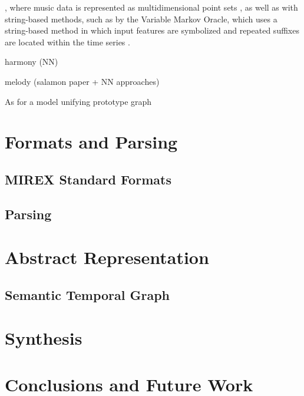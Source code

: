 \documentclass{article}
\begin{document}
, where music data is represented as multidimensional point sets \cite{Hsiao_2023_motifs}, as well as with string-based methods, such as 
by the Variable Markov Oracle, which uses a  string-based method in which input features are symbolized and
repeated suffixes are located within the time series \cite{motifs}.

harmony (NN)

melody (salamon paper + NN approaches)

As for a model unifying 
prototype graph

\section{Formats and Parsing}\label{sec:formats}
\subsection{MIREX Standard Formats} \label{subsec:MIREX}
\subsection{Parsing} \label{subsec:parsing}

\section{Abstract Representation}\label{sec:representation}

\subsection{Semantic Temporal Graph} \label{subsec:st_graph}

\section{Synthesis} \label{sec:synthesis}


\section{Conclusions and Future Work}


\end{document}
